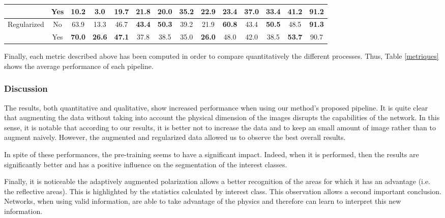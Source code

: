 \begin{table}[h]
{\begin{tabular}{c|c|ccccc|ccccc|c|c}
			& Yes                                   & 10.2          & 3.0           & 19.7          & 21.8          & 20.0           & 35.2          & 22.9          & 23.4          & 37.0          & 33.4           & 41.2                                     & 91.2                                                                        \\ \hline
			\multirow{2}{*}{Regularized}           & No                                    & 63.9          & 13.3          & 46.7          & \textbf{43.4} & \textbf{50.3}  & 39.2 & 21.9          & \textbf{60.8} & 43.4          & \textbf{50.5}  & 48.5                                     & \textbf{91.3}                                                                \\
			& Yes                                   & \textbf{70.0} & \textbf{26.6} & \textbf{47.1} & 37.8          & 38.5           & 35.0          & \textbf{26.0} & 48.0          & 42.0          & 38.5           & \textbf{53.7}                            & 90.7                                                              
		\end{tabular}%
	}
	
\end{table}

Finally, each metric described above has been computed in order to compare quantitatively the different processes. Thus, Table \ref{metriques} shows the average performance of each pipeline. 

\subsubsection{Discussion}

The results, both quantitative and qualitative, show increased performance when using our method's proposed pipeline. It is quite clear that augmenting the data without taking into account the physical dimension of the images disrupts the capabilities of the network. In this sense, it is notable that according to our results, it is better not to increase the data and to keep an small amount of image rather than to augment naively. 
However, the augmented and regularized data allowed us to observe the best overall results.

In spite of these performances, the pre-training seems to have a significant impact. Indeed, when it is performed, then the results are significantly better and has a positive influence on the segmentation of the interest classes.

Finally, it is noticeable the adaptively augmented polarization allows a better recognition of the areas for which it has an advantage (i.e. the reflective areas). This is highlighted by the statistics calculated by interest class. This observation allows a second important conclusion. Networks, when using valid information, are able to take advantage of the physics and therefore can learn to interpret this new information.

